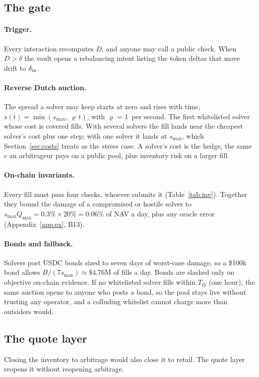\subsection{The gate}
\label{sec:gate}
\paragraph{Trigger.} Every interaction recomputes $D$, and anyone may call a public check. When $D>\delta$ the vault opens a rebalancing intent listing the token deltas that move drift to $\delta_{\mathrm{in}}$.

\paragraph{Reverse Dutch auction.} The spread a solver may keep starts at zero and rises with time, $s(t)=\min(s_{\max},\,\varrho\, t)$, with $\varrho$ = 1\bps\ per second. The first whitelisted solver whose cost is covered fills. With several solvers the fill lands near the cheapest solver's cost plus one step; with one solver it lands at $s_{\max}$, which Section~\ref{sec:costs} treats as the stress case. A solver's cost is the hedge, the same $c$ an arbitrageur pays on a public pool, plus inventory risk on a larger fill.

\paragraph{On-chain invariants.} Every fill must pass four checks, whoever submits it (Table~\ref{tab:inv}). Together they bound the damage of a compromised or hostile solver to $s_{\max}Q_{\max}=0.3\%\times20\%=0.06\%$ of NAV a day, plus any oracle error (Appendix~\ref{app:ex}, B13).


\paragraph{Bonds and fallback.} Solvers post USDC bonds sized to seven days of worst-case damage, so a \$100k bond allows $B/(7s_{\max})\approx\$4.76$M of fills a day. Bonds are slashed only on objective on-chain evidence. If no whitelisted solver fills within $T_{\mathrm{fb}}$ (one hour), the same auction opens to anyone who posts a bond, so the pool stays live without trusting any operator, and a colluding whitelist cannot charge more than outsiders would.

\subsection{The quote layer}
\label{sec:quote}
Closing the inventory to arbitrage would also close it to retail. The quote layer reopens it without reopening arbitrage.

